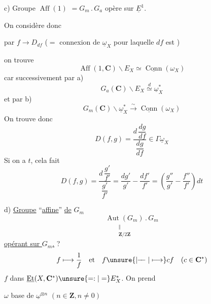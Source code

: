 c) Groupe $\operatorname{Aff}(1)$ 
$=G_m\mathbin{.}G_a$ opère sur $\underline E^1$.

On considère donc

par $f\longrightarrow D_{df}$ ($=$ connexion de $\underline\omega_X$
pour laquelle  $df$ est
)

on trouve
\[
\operatorname{Aff}(1,\mathbf C)\backslash E_X
\simeq\underline{\operatorname{Conn}}(\omega_X)
\]
car successivement par a)
\[
G_a(\mathbf C)\backslash E_X\overset{d}{\simeq}\underline\omega_X^*
\]
et par b)
\[
G_m(\mathbf C)\backslash\underline\omega_X^*
\overset{\sim}{\longrightarrow}\underline{\operatorname{Conn}}(\omega_X)
\]
On trouve donc
\[
D(f,g)=\frac{d\,\dfrac{dg}{df}}{\dfrac{dg}{df}}
\in\Gamma\underline\omega_X
\]
Si on a  $t$, cela fait
\[
D(f,g)=\frac{d\,\dfrac{g'}{f'}}{\dfrac{g'}{f'}}
=\frac{dg'}{g'}-\frac{df'}{f'}
=\left(\frac{g''}{g'}-\frac{f''}{f'}\right)dt
\]


d)  \uline{Groupe} ``\uline{affine}'' \uline{de} $G_m$
\[
\underset{\substack{\Vert\\\mathbf Z/2\mathbf Z}}{\operatorname{Aut}(G_m)}
\mathbin{.}G_m
\]
\uline{opérant sur $G_m$.} ?
\[
f\longmapsto\frac1f\quad\text{et}\quad
f\unsure{\mathrel{\mid\!\!-\!\!-}|\longmapsto}cf
\quad(c\in\mathbf C^*)
\]
$f$ dans $\underline{\operatorname{Et}}(X,\mathbf C^*)
\unsure{\mathrel{=:}|=}E_X^*$. On prend

$\omega$ base de $\underline\omega^{\otimes n}$ $(n\in\mathbf Z,n\ne0)$

